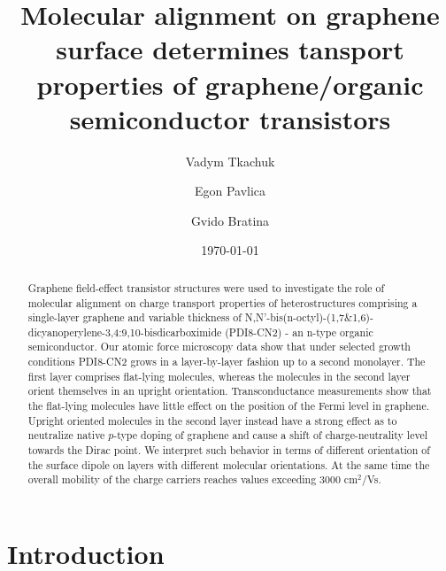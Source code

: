 \documentclass[preprint,aip,jap]{revtex4-2}
\begin{document}
\title{Molecular alignment on graphene surface determines tansport properties of graphene/organic semiconductor transistors}

\author{Vadym Tkachuk}%
\author{Egon Pavlica}%
\author{Gvido Bratina}%
%
\date{\today}

\begin{abstract}

  Graphene field-effect transistor structures were used to investigate the role of molecular alignment on charge transport properties of heterostructures comprising a single-layer graphene and variable thickness of N,N'-bis(n-octyl)-(1,7\&1,6)-dicyanoperylene-3,4:9,10-bisdicarboximide (PDI8-CN2) - an n-type organic semiconductor.
 Our atomic force microscopy data show that under selected growth conditions PDI8-CN2 grows in a layer-by-layer fashion up to a second monolayer.
 The first layer comprises flat-lying molecules, whereas the molecules in the second layer orient themselves in an upright orientation.
 Transconductance measurements show that the flat-lying molecules have little effect on the position of the Fermi level in graphene.
 Upright oriented molecules in the second layer instead have a strong effect as to neutralize native $p$-type doping of graphene and cause a shift of charge-neutrality level towards the Dirac point.
 We interpret such behavior in terms of different orientation of the surface dipole on layers with different molecular orientations.
 At the same time the overall mobility of the charge carriers reaches values exceeding 3000 cm$^{2}$/Vs.

  
\end{abstract}


\maketitle

\section{\label{sec:intro}Introduction}
\end{document}
